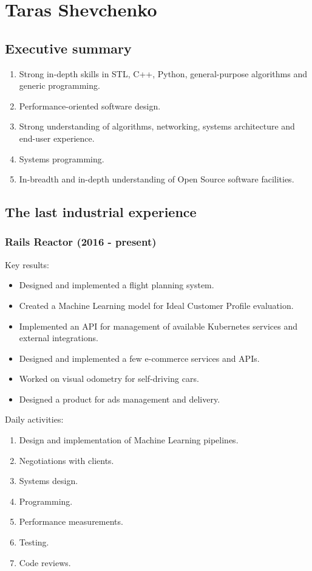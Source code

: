 \documentclass[a4paper,12pt,final]{extreport}
\begin{document}
\section{Taras Shevchenko}
\subsection{Executive summary}
\begin{enumerate}
  \item Strong in-depth skills in STL, C++, Python, general-purpose algorithms and generic programming.
  \item Performance-oriented software design.
  \item Strong understanding of algorithms, networking, systems architecture and end-user experience.
  \item Systems programming.
  \item In-breadth and in-depth understanding of Open Source software facilities.
\end{enumerate}

\subsection{The last industrial experience}
\subsubsection{Rails Reactor (2016 - present)}
Key results:
\begin{itemize}
  \item Designed and implemented a flight planning system.
  \item Created a Machine Learning model for Ideal Customer Profile evaluation.
  \item Implemented an API for management of available Kubernetes services and external integrations.
  \item Designed and implemented a few e-commerce services and APIs.
  \item Worked on visual odometry for self-driving cars.  
  \item Designed a product for ads management and delivery.
\end{itemize}
Daily activities:
\begin{enumerate}
    \item Design and implementation of Machine Learning pipelines.
    \item Negotiations with clients.
    \item Systems design.
    \item Programming.
    \item Performance measurements.
    \item Testing.
    \item Code reviews.
\end{enumerate}
\pagebreak
\end{document}
